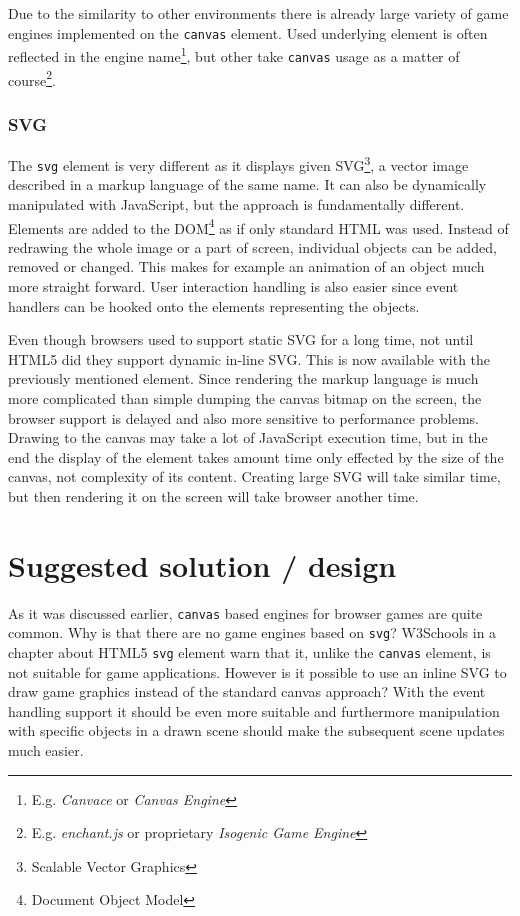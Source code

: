 \documentclass[11pt,oneside, final]{fithesis2}
\begin{document}
Due to the similarity to other environments there is already large variety of game engines implemented on the \texttt{canvas} element. Used underlying element is often reflected in the engine name\footnote{E.g. \emph{Canvace}\cite{canvace} or \emph{Canvas Engine}\cite{canvasengine}}, but other take \texttt{canvas} usage as a matter of course\footnote{E.g. \emph{enchant.js}\cite{enchantjs} or proprietary \emph{Isogenic Game Engine}\cite{isogenic}}.

\subsection{SVG}
The \texttt{svg} element is very different as it displays given SVG\footnote{Scalable Vector Graphics}, a vector image described in a markup language of the same name. It can also be dynamically manipulated with JavaScript, but the approach is fundamentally different. Elements are added to the DOM\footnote{Document Object Model} as if only standard HTML was used. Instead of redrawing the whole image or a part of screen, individual objects can be added, removed or changed. This makes for example an animation of an object much more straight forward. User interaction handling is also easier since event handlers can be hooked onto the elements representing the objects.

Even though browsers used to support static SVG for a long time, not until HTML5 did they support dynamic in-line SVG\cite{w3_html5}. This is now available with the previously mentioned element. Since rendering the markup language is much more complicated than simple dumping the canvas bitmap on the screen, the browser support is delayed and also more sensitive to performance problems. Drawing to the canvas may take a lot of JavaScript execution time, but in the end the display of the element takes amount time only effected by the size of the canvas, not complexity of its content. Creating large SVG will take similar time, but then rendering it on the screen will take browser another time.

\chapter{Suggested solution / design}
\label{solution}
As it was discussed earlier, \texttt{canvas} based engines for browser games are quite common. Why is that there are no game engines based on \texttt{svg}? W3Schools in a chapter about HTML5 \texttt{svg} element warn that it, unlike the \texttt{canvas} element, is not suitable for game applications\cite{html5svg}. However is it possible to use an inline SVG to draw game graphics instead of the standard canvas approach? With the event handling support it should be even more suitable and furthermore manipulation with specific objects in a drawn scene should make the subsequent scene updates much easier.
\end{document}
